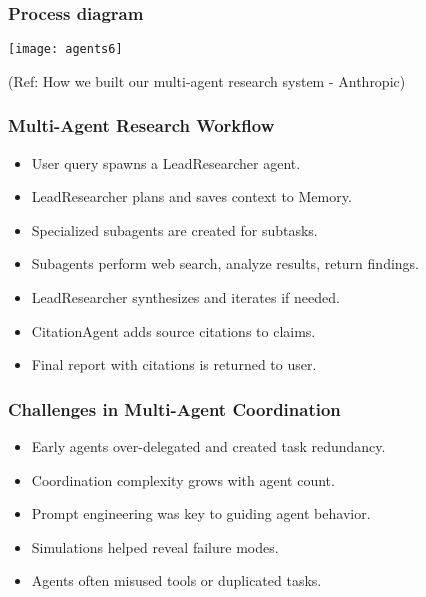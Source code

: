 \begin{frame}[fragile]\frametitle{Process diagram}
	
	\begin{center}
	\texttt{[image: agents6]}
	\end{center}
	
{\tiny (Ref: How we built our multi-agent research system - Anthropic)}

\end{frame}

\begin{frame}[fragile]\frametitle{Multi-Agent Research Workflow}
    \begin{itemize}
        \item User query spawns a LeadResearcher agent.
        \item LeadResearcher plans and saves context to Memory.
        \item Specialized subagents are created for subtasks.
        \item Subagents perform web search, analyze results, return findings.
        \item LeadResearcher synthesizes and iterates if needed.
        \item CitationAgent adds source citations to claims.
        \item Final report with citations is returned to user.
    \end{itemize}
\end{frame}

\begin{frame}[fragile]\frametitle{Challenges in Multi-Agent Coordination}
    \begin{itemize}
        \item Early agents over-delegated and created task redundancy.
        \item Coordination complexity grows with agent count.
        \item Prompt engineering was key to guiding agent behavior.
        \item Simulations helped reveal failure modes.
        \item Agents often misused tools or duplicated tasks.
    \end{itemize}
\end{frame}

